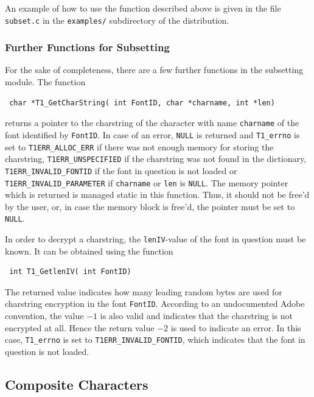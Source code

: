An example of how to use the function described above is given in the file
\verb+subset.c+ in the \verb+examples/+ subdirectory of the distribution.  

\subsubsection{Further Functions for Subsetting}
\label{Further Functions for Subsetting}%

For the sake of completeness, there are a few further functions in the
subsetting module. The function
\precorr
\begin{verbatim}
 char *T1_GetCharString( int FontID, char *charname, int *len)
\end{verbatim}\postcorr
returns a pointer to the charstring of the character with name \verb+charname+
of the font identified by \verb+FontID+. In case of an error, \verb+NULL+ is
returned and \verb+T1_errno+ is set to \verb+T1ERR_ALLOC_ERR+ if there was not
enough memory for storing the charstring, \verb+T1ERR_UNSPECIFIED+ if the
charstring was not found in the dictionary, \verb+T1ERR_INVALID_FONTID+ if the
font in question is not loaded or \verb+T1ERR_INVALID_PARAMETER+ if
\verb+charname+ or \verb+len+ is \verb+NULL+. The memory pointer which is
returned is managed static in this function. Thus, it should not be free'd by
the user, or, in case the memory block is free'd, the pointer must be set to
\verb+NULL+.

In order to decrypt a charstring, the \verb+lenIV+-value of the font in
question must be known. It can be obtained using the function
\precorr
\begin{verbatim}
 int T1_GetlenIV( int FontID)
\end{verbatim}\postcorr
The returned value indicates how many leading random bytes are used for
charstring encryption in the font \verb+FontID+. According to an undocumented
Adobe convention, the value $-1$ is also valid and indicates that the
charstring is not encrypted at all. Hence the return value $-2$ is used to
indicate an error. In this case, \verb+T1_errno+ is set to
\verb+T1ERR_INVALID_FONTID+, which indicates that the font in question is not
loaded.   


\subsection{Composite Characters}
\label{subsec:CompositeCharacters}%

